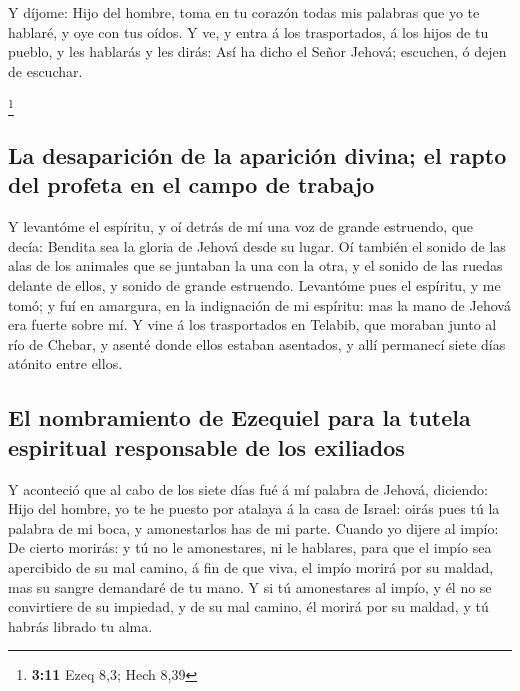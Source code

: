  Y díjome: Hijo del hombre, toma en tu corazón todas mis
palabras que yo te hablaré, y oye con tus oídos.  Y ve, y
entra á los trasportados, á los hijos de tu pueblo, y les hablarás y les
dirás: Así ha dicho el Señor Jehová; escuchen, ó dejen de escuchar.

\footnote{\textbf{3:11} Ezeq 8,3; Hech 8,39}

\hypertarget{la-desapariciuxf3n-de-la-apariciuxf3n-divina-el-rapto-del-profeta-en-el-campo-de-trabajo}{%
\subsection{La desaparición de la aparición divina; el rapto del profeta
en el campo de
trabajo}\label{la-desapariciuxf3n-de-la-apariciuxf3n-divina-el-rapto-del-profeta-en-el-campo-de-trabajo}}

 Y levantóme el espíritu, y oí detrás de mí una voz de
grande estruendo, que decía: Bendita sea la gloria de Jehová desde su
lugar.  Oí también el sonido de las alas de los animales
que se juntaban la una con la otra, y el sonido de las ruedas delante de
ellos, y sonido de grande estruendo.  Levantóme pues el
espíritu, y me tomó; y fuí en amargura, en la indignación de mi
espíritu: mas la mano de Jehová era fuerte sobre mí.  Y
vine á los trasportados en Telabib, que moraban junto al río de Chebar,
y asenté donde ellos estaban asentados, y allí permanecí siete días
atónito entre ellos.

\hypertarget{el-nombramiento-de-ezequiel-para-la-tutela-espiritual-responsable-de-los-exiliados}{%
\subsection{El nombramiento de Ezequiel para la tutela espiritual
responsable de los
exiliados}\label{el-nombramiento-de-ezequiel-para-la-tutela-espiritual-responsable-de-los-exiliados}}

 Y aconteció que al cabo de los siete días fué á mí palabra
de Jehová, diciendo:  Hijo del hombre, yo te he puesto por
atalaya á la casa de Israel: oirás pues tú la palabra de mi boca, y
amonestarlos has de mi parte.  Cuando yo dijere al impío:
De cierto morirás: y tú no le amonestares, ni le hablares, para que el
impío sea apercibido de su mal camino, á fin de que viva, el impío
morirá por su maldad, mas su sangre demandaré de tu mano. 
Y si tú amonestares al impío, y él no se convirtiere de su impiedad, y
de su mal camino, él morirá por su maldad, y tú habrás librado tu alma.

